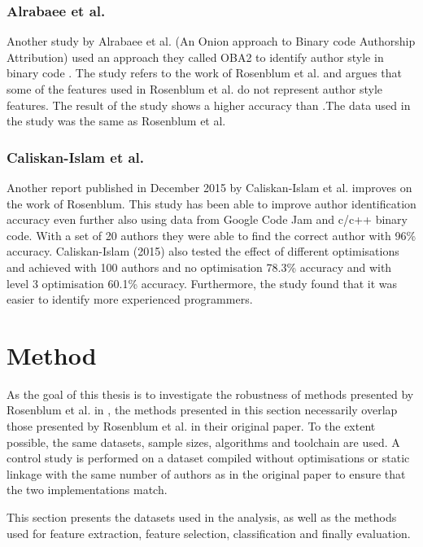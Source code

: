 \documentclass[a4paper,11pt]{kth-mag}
\begin{document}
\subsection{Alrabaee et al.}
Another study by Alrabaee et al. (An Onion approach to Binary code Authorship
Attribution) used an approach they called OBA2 to identify author style in
binary code \parencite{alrabaee2014oba2}. The study refers to the work of
Rosenblum et al. and argues that some of the features used in Rosenblum et al.
do not represent author style features. The result of the study
shows a higher accuracy than \parencite{rosenblum2011wrote}.The data used in
the study was the same as Rosenblum et al. 

\subsection{Caliskan-Islam et al.}
Another report published in December 2015 by Caliskan-Islam et al. improves on
the work of Rosenblum. This study has been able to improve author
identification accuracy even further also using data from Google Code Jam and
c/c++ binary code. With a set of 20 authors they were able to find the correct
author with 96\% accuracy. Caliskan-Islam (2015) also tested the effect of
different optimisations and achieved with 100 authors and no optimisation 78.3\%
accuracy and with level 3 optimisation 60.1\% accuracy. Furthermore, the study
found that it was easier to identify more experienced programmers.

\chapter{Method} \label{ch:method}
As the goal of this thesis is to investigate the robustness of methods
presented by Rosenblum et al. in \parencite{rosenblum2011wrote}, the methods
presented in this section necessarily overlap those presented by Rosenblum et
al. in their original paper. To the extent possible, the same datasets, sample
sizes, algorithms and toolchain are used. A control study is performed on a
dataset compiled without optimisations or static linkage with the same number
of authors as in the original paper to ensure that the two implementations
match. 

This section presents the datasets used in the analysis, as well as the methods
used for feature extraction, feature selection, classification and finally
evaluation.
\end{document}
